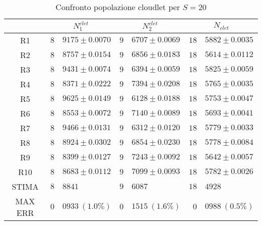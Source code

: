 \begin{table}[!h]
\begin{tabular}{c|r@{.}l|r@{.}l|r@{.}l}
& \multicolumn{2}{|c|}{$N_1^{clet}$}
& \multicolumn{2}{|c|}{$N_2^{clet}$}
& \multicolumn{2}{|c}{$N_{clet}$} 
\\          
\hline
R1      & $8$&$9175 \pm 0.0070$ & $9$&$6707 \pm 0.0069$ & $18$&$5882 \pm 0.0035$ \\
R2      & $8$&$8757 \pm 0.0154$ & $9$&$6856 \pm 0.0183$ & $18$&$5614 \pm 0.0112$ \\
R3      & $8$&$9431 \pm 0.0074$ & $9$&$6394 \pm 0.0059$ & $18$&$5825 \pm 0.0059$ \\
R4      & $8$&$8371 \pm 0.0222$ & $9$&$7394 \pm 0.0208$ & $18$&$5765 \pm 0.0035$ \\
R5      & $8$&$9625 \pm 0.0149$ & $9$&$6128 \pm 0.0188$ & $18$&$5753 \pm 0.0047$ \\
R6      & $8$&$8553 \pm 0.0072$ & $9$&$7140 \pm 0.0089$ & $18$&$5693 \pm 0.0041$ \\
R7      & $8$&$9466 \pm 0.0131$ & $9$&$6312 \pm 0.0120$ & $18$&$5779 \pm 0.0033$ \\
R8      & $8$&$8924 \pm 0.0302$ & $9$&$6854 \pm 0.0230$ & $18$&$5778 \pm 0.0084$ \\
R9      & $8$&$8399 \pm 0.0127$ & $9$&$7243 \pm 0.0092$ & $18$&$5642 \pm 0.0057$ \\
R10     & $8$&$8683 \pm 0.0112$ & $9$&$7099 \pm 0.0093$ & $18$&$5782 \pm 0.0026$ \\
STIMA   & $8$&$8841$            & $9$&$6087$            & $18$&$4928$            \\
MAX ERR & $0$&$0933 \ (1.0\%)$  & $0$&$1515 \ (1.6\%)$  & $0$&$0988 \ (0.5\%)$     
\end{tabular}
\centering
\caption{Confronto popolazione cloudlet per $S=20$}
\label{tab:20_nclet}
\end{table}
